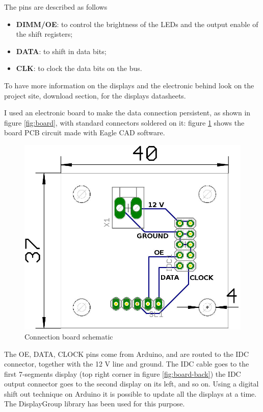 \documentclass[11pt,english]{article}
\begin{document}
The pins are described as follows
\begin{itemize}
 \item \textbf{DIMM/OE}: to control the brightness of the LEDs and the output enable of the shift registers;
 \item \textbf{DATA}: to shift in data bits;
 \item \textbf{CLK}: to clock the data bits on the bus.
\end{itemize}

To have more information on the displays and the electronic behind look on the project site, download 
section, for the displays datasheets.

I used an electronic board to make the data connection persistent, as shown in figure \ref{fig:board}, 
with standard connectors soldered on it: figure \ref{fig:board-schem} shows the board PCB circuit made with 
Eagle CAD software.

%
\begin{figure}[htb]
\centering\includegraphics[scale=0.30]{img/Board-schem}

\caption{Connection board schematic \label{fig:board-schem}}

\end{figure}

The OE, DATA, CLOCK pins come from Arduino, and are routed to the IDC connector, together with the 12 V line and 
ground. The IDC cable goes to the first 7-segments display (top right corner in figure \ref{fig:board-back})
the IDC output connector goes to the second display on its left, and so on. Using a digital shift out technique 
on Arduino it is possible to update all the displays at a time. The DisplayGroup library has been used for this 
purpose.
\end{document}
